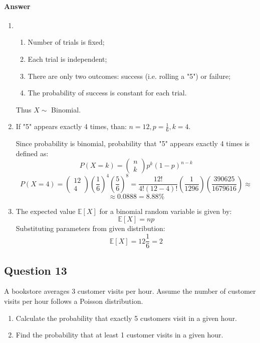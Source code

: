 \documentclass{article}
\begin{document}
\paragraph{Answer}
\begin{enumerate}
    \item \begin{enumerate}
        \item Number of trials is fixed;
        \item Each trial is independent;
        \item There are only two outcomes: success (i.e. rolling a "5") or failure;
        \item The probability of success is constant for each trial.
    \end{enumerate}
    Thus $X \sim$ Binomial.
    \item If "5" appears exactly 4 times, than:
    $n=12,p=\frac{1}{6},k=4$.
    
    Since probability is binomial, probability that "5" appears exactly 4 times is defined as:
    $$P(X=k)= \left( \begin{array}{c} n \\ k \end{array} \right)p^k(1-p)^{n-k} $$
    $$P(X =4)=\left( \begin{array}{c} 12 \\ 4 \end{array} \right) \left(\frac{1}{6}\right)^4 \left(\frac{5}{6}\right)^8= \frac{12!}{4!(12-4)!}\left(\frac{1}{1296}\right) \left(\frac{390625}{1679616}\right) \approx$$
    $$ \approx 0.0888 = 8.88\%$$
    \item The expected value $\mathbb E[X]$ for a binomial random variable is given by:
    $$\mathbb E[X]=np$$
    Substituting parameters from given distribution:
    $$\mathbb E[X]=12\frac{1}{6}=2$$
\end{enumerate}

\subsection{Question 13}
A bookstore averages 3 customer visits per hour. Assume the number of customer visits per hour follows a Poisson distribution.
\begin{enumerate}
    \item Calculate the probability that exactly 5 customers visit in a given hour.
    \item Find the probability that at least 1 customer visits in a given hour.
\end{enumerate}
\end{document}
